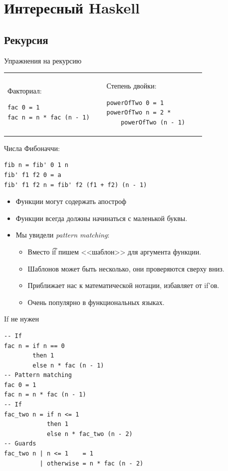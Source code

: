 \section{Интересный Haskell}
\subsection{Рекурсия}

\begin{frame}
\end{frame}

\begin{frame}[t,fragile]{Упражнения на рекурсию}
	\begin{tabular}{p{0.45\linewidth}p{0.45\linewidth}}
	\centering
	Факториал:
\begin{verbatim}
fac 0 = 1
fac n = n * fac (n - 1)
\end{verbatim}
	&
	Степень двойки: \pause
\begin{verbatim}
powerOfTwo 0 = 1
powerOfTwo n = 2 *
    powerOfTwo (n - 1)
\end{verbatim}
	\end{tabular}
	\vspace{-10pt}

	Числа Фибоначчи: \pause
\begin{verbatim}
fib n = fib' 0 1 n
fib' f1 f2 0 = a
fib' f1 f2 n = fib' f2 (f1 + f2) (n - 1)
\end{verbatim}
	\begin{itemize}
		\item Функции могут содержать апостроф
		\item Функции всегда должны начинаться с маленькой буквы.
		\item Мы увидели \textit{pattern matching}:
			\begin{itemize}
				\item Вместо \t{if} пишем <<шаблон>> для аргумента функции.
				\item Шаблонов может быть несколько, они проверяются сверху вниз.
				\item Приближает нас к математической нотации, избавляет от if'ов.
				\item Очень популярно в функциональных языках.
			\end{itemize}
	\end{itemize}
\end{frame}

\begin{frame}[fragile]{If не нужен}
\begin{verbatim}
-- If
fac n = if n == 0
        then 1
        else n * fac (n - 1)
-- Pattern matching
fac 0 = 1
fac n = n * fac (n - 1)
-- If
fac_two n = if n <= 1
            then 1
            else n * fac_two (n - 2)
-- Guards
fac_two n | n <= 1    = 1
          | otherwise = n * fac (n - 2)
\end{verbatim}
\end{frame}

